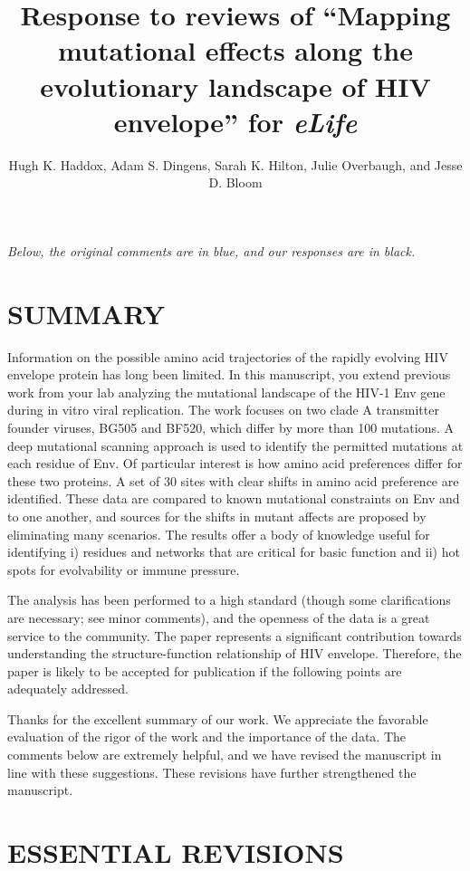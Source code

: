 \documentclass[11pt, oneside]{article}   	%
\title{Response to reviews of ``Mapping mutational effects along the evolutionary landscape of HIV envelope'' for \textit{eLife}}
\author{Hugh K. Haddox, Adam S. Dingens, Sarah K. Hilton, Julie Overbaugh, and Jesse D. Bloom}
\begin{document}
\maketitle

\emph{Below, the original comments {\color{blue} are in blue}, and our responses are in black.}

\color{blue}

\section*{SUMMARY} 

Information on the possible amino acid trajectories of the rapidly evolving HIV envelope protein has long been limited. In this manuscript, you extend previous work from your lab analyzing the mutational landscape of the HIV-1 Env gene during in vitro viral replication. The work focuses on two clade A transmitter founder viruses, BG505 and BF520, which differ by more than 100 mutations. A deep mutational scanning approach is used to identify the permitted mutations at each residue of Env. Of particular interest is how amino acid preferences differ for these two proteins. A set of 30 sites with clear shifts in amino acid preference are identified. These data are compared to known mutational constraints on Env and to one another, and sources for the shifts in mutant affects are proposed by eliminating many scenarios. The results offer a body of knowledge useful for identifying i) residues and networks that are critical for basic function and ii) hot spots for evolvability or immune pressure. 

The analysis has been performed to a high standard (though some clarifications are necessary; see minor comments), and the openness of the data is a great service to the community. The paper represents a significant contribution towards understanding the structure-function relationship of HIV envelope. Therefore, the paper is likely to be accepted for publication if the following points are adequately addressed. 

{\color{black}
Thanks for the excellent summary of our work.
We appreciate the favorable evaluation of the rigor of the work and the importance of the data.
The comments below are extremely helpful, and we have revised the manuscript in line with these suggestions.
These revisions have further strengthened the manuscript.
}

\section*{ESSENTIAL REVISIONS} 
\end{document}
